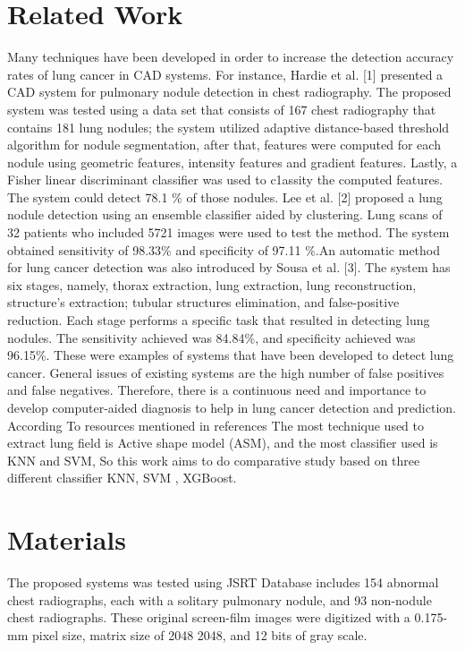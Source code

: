 \documentclass[hidelinks,12pt,xcolor=table]{article}
\begin{document}
\begin{multicols}{2}
\section{Related Work}
Many techniques have been developed in order to
increase the detection accuracy rates of lung cancer in CAD
systems. For instance, Hardie et al. [1] presented a CAD
system for pulmonary nodule detection in chest radiography.
The proposed system was tested using a data set that
consists of 167 chest radiography that contains 181 lung
nodules; the system utilized adaptive distance-based
threshold algorithm for nodule segmentation, after that,
features were computed for each nodule using geometric
features, intensity features and gradient features. Lastly, a
Fisher linear discriminant classifier was used to c1assity the
computed features. The system could detect 78.1 \% of those
nodules. Lee et al. [2] proposed a lung nodule detection
using an ensemble classifier aided by clustering. Lung scans
of 32 patients who included 5721 images were used to test
the method. The system obtained sensitivity of 98.33\% and
specificity of 97.11 \%.An automatic method for lung cancer detection was
also introduced by Sousa et al. [3]. The system has six
stages, namely, thorax extraction, lung extraction, lung
reconstruction, structure's extraction; tubular structures
elimination, and false-positive reduction. Each stage
performs a specific task that resulted in detecting lung
nodules. The sensitivity achieved was 84.84\%, and
specificity achieved was 96.15\%.
These were examples of systems that have been developed
to detect lung cancer. General issues of existing systems are
the high number of false positives and false negatives.
Therefore, there is a continuous need and importance to
develop computer-aided diagnosis to help in lung cancer
detection and prediction.
According To resources mentioned in references The most technique used to extract lung field is Active shape model (ASM), and the most classifier used is KNN and SVM, So this work aims to do comparative study based on three different classifier KNN, SVM , XGBoost.  
\section{Materials}
The proposed systems was tested using JSRT Database includes 154 abnormal chest radiographs, each with a solitary pulmonary nodule, and 93 non-nodule chest radiographs. These original screen-film images were digitized with a 0.175-mm pixel size, matrix size of 2048 2048, and 12 bits of gray scale.

\end{multicols}
\end{document}
